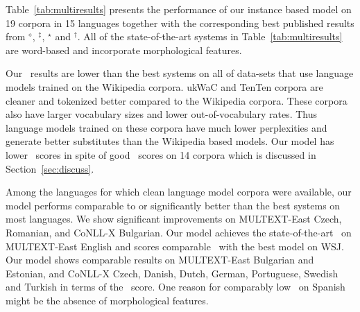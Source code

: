 Table~\ref{tab:multiresults} presents the performance of our instance based
model on 19 corpora in 15 languages together with the corresponding best
published results from
$^\diamond$\protect\cite{yatbaz-sert-yuret:2012:EMNLP-CoNLL},
$^\ddagger$\protect\cite{blunsom-cohn:2011:ACL-HLT2011},
$^\star$\protect\cite{christodoulopoulos-goldwater-steedman:2011:EMNLP} and
$^\dagger$\protect\cite{Clark:2003:CDM:1067807.1067817}.  All of the
state-of-the-art systems in Table~\ref{tab:multiresults} are word-based and
incorporate morphological features. 


Our \mto\ results are lower than the best systems on all of data-sets that use
language models trained on the Wikipedia corpora.  ukWaC and TenTen corpora are
cleaner and tokenized better compared to the Wikipedia corpora.  These corpora
also have larger vocabulary sizes and lower out-of-vocabulary rates.  Thus
language models trained on these corpora have much lower perplexities and
generate better substitutes than the Wikipedia based models.  Our model has
lower \vm\ scores in spite of good \mto\ scores on 14 corpora which is
discussed in Section~\ref{sec:discuss}.

Among the languages for which clean language model corpora were available, our
model performs comparable to or significantly better than the best systems on
most languages.  We show significant improvements on MULTEXT-East Czech,
Romanian, and CoNLL-X Bulgarian.  Our model achieves the state-of-the-art \mto\
on MULTEXT-East English and scores comparable \mto\ with the best model on WSJ.
Our model shows comparable results on MULTEXT-East Bulgarian and Estonian, and
CoNLL-X Czech, Danish, Dutch, German, Portuguese, Swedish and Turkish in terms
of the \mto\ score.  One reason for comparably low \mto\ on Spanish might be
the absence of morphological features.


